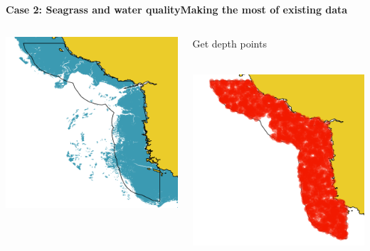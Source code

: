 \documentclass[serif]{beamer}\usepackage[]{graphicx}\usepackage[]{color}
\makeatletter
\def\maxwidth{ %
  \ifdim\Gin@nat@width>\linewidth
    \linewidth
  \else
    \Gin@nat@width
  \fi
}
\newenvironment{knitrout}{}{} %
\makeatother
\begin{document}
\begin{frame}{\textbf{Case 2: Seagrass and water quality}}{\textbf{Making the most of existing data}}
\begin{columns}[T]
\begin{column}{0.32\textwidth}
\begin{knitrout}
{\centering \includegraphics[width=\maxwidth]{fig//segsg} 

}



\end{knitrout}
\end{column}
\onslide<+->
\begin{column}{0.32\textwidth}
Get depth points\\~\\
\begin{knitrout}
\color{fgcolor}

{\centering \includegraphics[width=\maxwidth]{fig//segpt} 

}
\end{knitrout}
\end{column}
\end{columns}
\end{frame}
\end{document}
